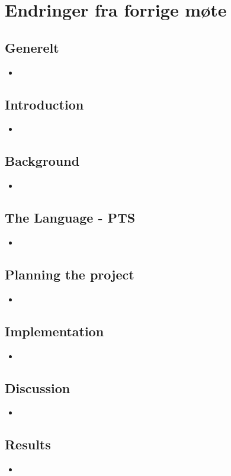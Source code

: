 
\chapter*{Endringer fra forrige møte}

\section*{Generelt}

\begin{itemize}
    \item
\end{itemize}

\section*{Introduction}

\begin{itemize}
    \item
\end{itemize}

\section*{Background}

\begin{itemize}
    \item
\end{itemize}

\section*{The Language - PTS}

\begin{itemize}
    \item
\end{itemize}

\section*{Planning the project}

\begin{itemize}
    \item
\end{itemize}

\section*{Implementation}

\begin{itemize}
    \item
\end{itemize}

\section*{Discussion}

\begin{itemize}
    \item
\end{itemize}

\section*{Results}

\begin{itemize}
    \item
\end{itemize}

